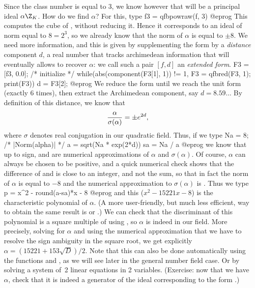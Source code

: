 Since the class number is equal to 3, we know however that  will
be a principal ideal $\alpha\Z_K$. How do we find $\alpha$? For this, type
\bprog
  f3 = qfbpowraw(f, 3)
@eprog
This computes the cube of , without
reducing it. Hence it corresponds to an ideal of norm equal to $8=2^3$, so we
already know that the norm of $\alpha$ is equal to $\pm8$. We need more
information, and this is given by supplementing the form by a \emph{distance}
component $d$, a real number that tracks archimedean information that will
eventually allows to recover $\alpha$: we call such a pair $[f,d]$ an
\emph{extended form}.
\bprog
  F3 = [f3, 0.0]; /* initialize */
  while(abs(component(F3[1], 1)) != 1, F3 = qfbred(F3, 1); print(F3))
  d = F3[2];
@eprog
We reduce the form  until we reach the unit form (exactly 6 times),
then extract the Archimedean component, say $d = 8.59\dots$
By definition of this distance, we know that
$${\alpha\over{\sigma(\alpha)}}=\pm e^{2d},$$
where $\sigma$ denotes real conjugation in our quadratic field. Thus, if we type
\bprog
  Na = 8; /* |Norm(alpha)| */
  a = sqrt(Na * exp(2*d))
  sa = Na / a
@eprog\noindent
we know that up to sign,  and  are
numerical approximations of $\alpha$ and $\sigma(\alpha)$. Of course,
$\alpha$ can always be chosen to be positive, and a quick numerical check
shows that the difference of  and  is close to an integer, and
not the sum, so that in fact the norm of $\alpha$ is equal to $-8$ and the
numerical approximation to $\sigma(\alpha)$ is . Thus we type
\bprog
  p = x^2 - round(a-sa)*x - 8
@eprog\noindent
and this ($x^2 - 15221x - 8$) is the characteristic polynomial of $\alpha$.
(A more user-friendly, but much less efficient, way to obtain the same result
is  or .)
We can check that the discriminant of this polynomial is a square multiple of
 using , so $\alpha$ is indeed in our
field. More precisely, solving for $\alpha$ and using the numerical
approximation that we have to resolve the sign ambiguity in the square root,
we get explicitly $\alpha=(15221+153\sqrt D)/2$. Note that this can also be
done automatically using the functions  and , as
we will see later in the general number field case. Or by solving a system
of~2 linear equations in 2 variables. (Exercise: now that we have $\alpha$,
check that it is indeed a generator of the ideal corresponding to the form
.)

